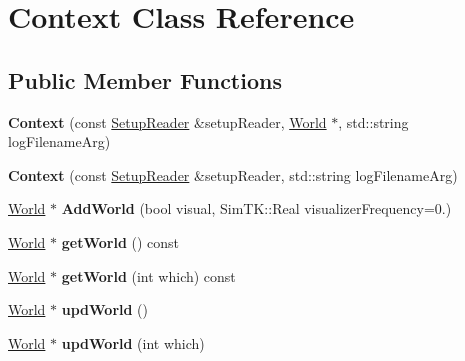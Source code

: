 \hypertarget{classContext}{}\section{Context Class Reference}
\label{classContext}
\subsection*{Public Member Functions}
\begin{DoxyCompactItemize}
\item 
{\bfseries Context} (const \hyperlink{classSetupReader}{Setup\+Reader} \&setup\+Reader, \hyperlink{classWorld}{World} $\ast$, std\+::string log\+Filename\+Arg)\hypertarget{classContext_a6e4e9c4b84131ee9444c09898a35ebb5}{}\label{classContext_a6e4e9c4b84131ee9444c09898a35ebb5}

\item 
{\bfseries Context} (const \hyperlink{classSetupReader}{Setup\+Reader} \&setup\+Reader, std\+::string log\+Filename\+Arg)\hypertarget{classContext_a86b58f3d114611bae1adca9ef994e635}{}\label{classContext_a86b58f3d114611bae1adca9ef994e635}

\item 
\hyperlink{classWorld}{World} $\ast$ {\bfseries Add\+World} (bool visual, Sim\+T\+K\+::\+Real visualizer\+Frequency=0.)\hypertarget{classContext_a26871eab3b4d582d71946f71f0e41e2d}{}\label{classContext_a26871eab3b4d582d71946f71f0e41e2d}

\item 
\hyperlink{classWorld}{World} $\ast$ {\bfseries get\+World} () const \hypertarget{classContext_aaa4a6f192a80b8c95fb3c8ed2b7089e6}{}\label{classContext_aaa4a6f192a80b8c95fb3c8ed2b7089e6}

\item 
\hyperlink{classWorld}{World} $\ast$ {\bfseries get\+World} (int which) const \hypertarget{classContext_a59ef49f3ad910f73bf7101a85b30208f}{}\label{classContext_a59ef49f3ad910f73bf7101a85b30208f}

\item 
\hyperlink{classWorld}{World} $\ast$ {\bfseries upd\+World} ()\hypertarget{classContext_a66e0ae4f45acca7572f2f9009c24acc7}{}\label{classContext_a66e0ae4f45acca7572f2f9009c24acc7}

\item 
\hyperlink{classWorld}{World} $\ast$ {\bfseries upd\+World} (int which)\hypertarget{classContext_afc4d3df76061253608081ba831940647}{}\label{classContext_afc4d3df76061253608081ba831940647}


\end{DoxyCompactItemize}
